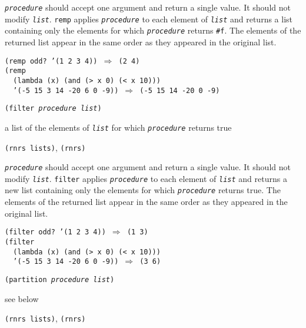 \texttt{\textit{procedure}} should accept one argument and return a single value.
It should not modify \texttt{\textit{list}}.
\texttt{remp} applies \texttt{\textit{procedure}} to each element of \texttt{\textit{list}}
and returns a list containing only the elements for which
\texttt{\textit{procedure}} returns \texttt{\#{}f}.
The elements of the returned list appear in the same order as they
appeared in the original list.

\begin{alltt}
(remp odd? '(1 2 3 4)) \(\Rightarrow\) (2 4)
(remp
  (lambda (x) (and (\textgreater{} x 0) (\textless{} x 10)))
  '(-5 15 3 14 -20 6 0 -9)) \(\Rightarrow\) (-5 15 14 -20 0 -9)
\end{alltt}

\begin{description}

\label{objects_s55}\item[procedure] \texttt{(filter \textit{procedure} \textit{list})}



\item[returns] a list of the elements of \texttt{\textit{list}} for which \texttt{\textit{procedure}} returns true


\item[libraries] \texttt{(rnrs lists)}, \texttt{(rnrs)}
\end{description}

\texttt{\textit{procedure}} should accept one argument and return a single value.
It should not modify \texttt{\textit{list}}.
\texttt{filter} applies \texttt{\textit{procedure}} to each element of \texttt{\textit{list}}
and returns a new list containing only the elements for which
\texttt{\textit{procedure}} returns true.
The elements of the returned list appear in the same order as they
appeared in the original list.

\begin{alltt}
(filter odd? '(1 2 3 4)) \(\Rightarrow\) (1 3)
(filter
  (lambda (x) (and (\textgreater{} x 0) (\textless{} x 10)))
  '(-5 15 3 14 -20 6 0 -9)) \(\Rightarrow\) (3 6)
\end{alltt}

\begin{description}

\label{objects_s56}\item[procedure] \texttt{(partition \textit{procedure} \textit{list})}



\item[returns] see below


\item[libraries] \texttt{(rnrs lists)}, \texttt{(rnrs)}
\end{description}

